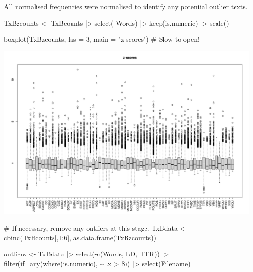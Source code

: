 \documentclass[
  letterpaper,
  DIV=11,
  numbers=noendperiod]{scrreprt}
\newenvironment{Shaded}{\begin{snugshade}}{\end{snugshade}}
\newcommand{\AttributeTok}[1]{\textcolor[rgb]{0.40,0.45,0.13}{#1}}
\newcommand{\CommentTok}[1]{\textcolor[rgb]{0.37,0.37,0.37}{#1}}
\newcommand{\DecValTok}[1]{\textcolor[rgb]{0.68,0.00,0.00}{#1}}
\newcommand{\FunctionTok}[1]{\textcolor[rgb]{0.28,0.35,0.67}{#1}}
\newcommand{\NormalTok}[1]{\textcolor[rgb]{0.00,0.23,0.31}{#1}}
\newcommand{\OtherTok}[1]{\textcolor[rgb]{0.00,0.23,0.31}{#1}}
\newcommand{\SpecialCharTok}[1]{\textcolor[rgb]{0.37,0.37,0.37}{#1}}
\newcommand{\StringTok}[1]{\textcolor[rgb]{0.13,0.47,0.30}{#1}}
\begin{document}
All normalised frequencies were normalised to identify any potential
outlier texts.

\begin{Shaded}
\begin{Highlighting}[]
\NormalTok{TxBzcounts }\OtherTok{\textless{}{-}}\NormalTok{ TxBcounts }\SpecialCharTok{|\textgreater{}} 
  \FunctionTok{select}\NormalTok{(}\SpecialCharTok{{-}}\NormalTok{Words) }\SpecialCharTok{|\textgreater{}}  
  \FunctionTok{keep}\NormalTok{(is.numeric) }\SpecialCharTok{|\textgreater{}}  
  \FunctionTok{scale}\NormalTok{()}

\FunctionTok{boxplot}\NormalTok{(TxBzcounts, }\AttributeTok{las =} \DecValTok{3}\NormalTok{, }\AttributeTok{main =} \StringTok{"z{-}scores"}\NormalTok{) }\CommentTok{\# Slow to open!}
\end{Highlighting}
\end{Shaded}

\includegraphics{D_Ch6_DataPrep_files/figure-pdf/z-standardisation-outliers-1.pdf}

\begin{Shaded}
\begin{Highlighting}[]
\CommentTok{\# If necessary, remove any outliers at this stage.}
\NormalTok{TxBdata }\OtherTok{\textless{}{-}} \FunctionTok{cbind}\NormalTok{(TxBcounts[,}\DecValTok{1}\SpecialCharTok{:}\DecValTok{6}\NormalTok{], }\FunctionTok{as.data.frame}\NormalTok{(TxBzcounts))}

\NormalTok{outliers }\OtherTok{\textless{}{-}}\NormalTok{ TxBdata }\SpecialCharTok{|\textgreater{}}  
  \FunctionTok{select}\NormalTok{(}\SpecialCharTok{{-}}\FunctionTok{c}\NormalTok{(Words, LD, TTR)) }\SpecialCharTok{|\textgreater{}}  
  \FunctionTok{filter}\NormalTok{(}\FunctionTok{if\_any}\NormalTok{(}\FunctionTok{where}\NormalTok{(is.numeric), }\SpecialCharTok{\textasciitilde{}}\NormalTok{ .x }\SpecialCharTok{\textgreater{}} \DecValTok{8}\NormalTok{)) }\SpecialCharTok{|\textgreater{}}  
  \FunctionTok{select}\NormalTok{(Filename)}
\end{Highlighting}
\end{Shaded}
\end{document}
